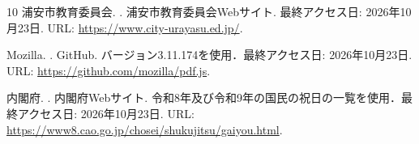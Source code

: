 \documentclass[a4paper,12pt,oneside]{jex}
\begin{document}
\begin{thebibliography}{10}
浦安市教育委員会.
.
\newblock 浦安市教育委員会Webサイト.
\newblock 最終アクセス日: 2026年10月23日.
\newblock URL: \url{https://www.city-urayasu.ed.jp/}.

Mozilla.
.
\newblock GitHub.
\newblock バージョン3.11.174を使用．最終アクセス日: 2026年10月23日.
\newblock URL: \url{https://github.com/mozilla/pdf.js}.

内閣府.
.
\newblock 内閣府Webサイト.
\newblock 令和8年及び令和9年の国民の祝日の一覧を使用．最終アクセス日: 2026年10月23日.
\newblock URL: \url{https://www8.cao.go.jp/chosei/shukujitsu/gaiyou.html}.

\end{thebibliography}
\end{document}
